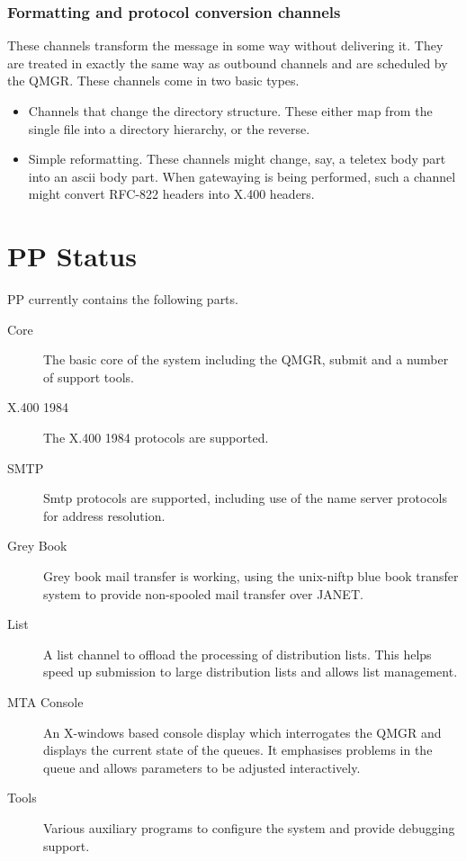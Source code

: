 \subsubsection{Formatting and protocol conversion channels}
These channels transform the message in some way without delivering
it. They are treated in exactly the same way as outbound channels and
are scheduled by the QMGR. These channels come in two basic types.
\begin{itemize}
\item	Channels that change the directory structure. These either map
from the single file into a directory hierarchy, or the reverse.

\item	Simple reformatting. These channels might change, say, a teletex
body part into an ascii body part. When gatewaying is being performed,
such a channel might convert RFC-822 headers into X.400 headers.
\end{itemize}

\section{PP Status}

PP currently contains the following parts.

\begin{description}
\item[Core]	The basic core of the system including the QMGR,
submit and a number of support tools.

\item[X.400 1984] The X.400 1984 protocols are supported.

\item[SMTP]	Smtp protocols are supported, including use of the
name server protocols for address resolution.

\item[Grey Book] Grey book mail transfer is working, using  the
unix-niftp blue book transfer system to provide non-spooled mail
transfer over JANET.

\item[List]	A list channel to offload the processing of
distribution lists. This helps speed up submission to large
distribution lists and allows list management.


\item[MTA Console]	An X-windows based console display which
interrogates the QMGR and displays the current state of the
queues. It emphasises problems in the queue and allows parameters to
be adjusted interactively.

\item[Tools]	Various auxiliary programs to configure the system and
provide debugging support.
 
\end{description}

